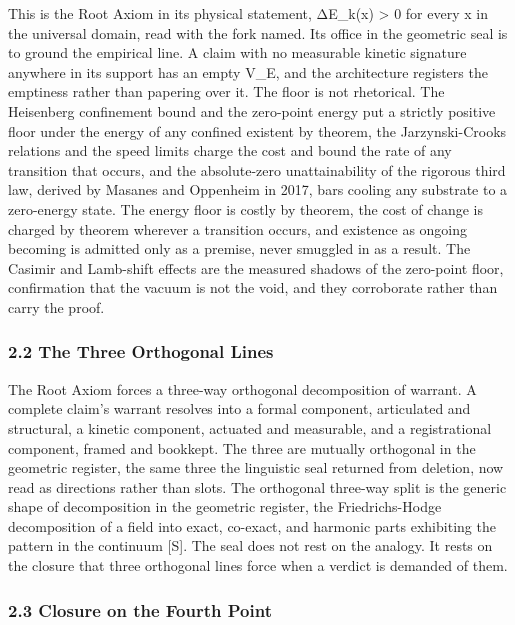 \documentclass[10pt,twocolumn]{article}
\begin{document}
This is the Root Axiom in its physical statement, ΔE\_k(x)
\textgreater{} 0 for every x in the universal domain, read with the fork
named. Its office in the geometric seal is to ground the empirical line.
A claim with no measurable kinetic signature anywhere in its support has
an empty V\_E, and the architecture registers the emptiness rather than
papering over it. The floor is not rhetorical. The Heisenberg
confinement bound and the zero-point energy put a strictly positive
floor under the energy of any confined existent by theorem, the
Jarzynski-Crooks relations and the speed limits charge the cost and
bound the rate of any transition that occurs, and the absolute-zero
unattainability of the rigorous third law, derived by Masanes and
Oppenheim in 2017, bars cooling any substrate to a zero-energy state.
The energy floor is costly by theorem, the cost of change is charged by
theorem wherever a transition occurs, and existence as ongoing becoming
is admitted only as a premise, never smuggled in as a result. The
Casimir and Lamb-shift effects are the measured shadows of the
zero-point floor, confirmation that the vacuum is not the void, and they
corroborate rather than carry the proof.

\hypertarget{the-three-orthogonal-lines}{%
\subsubsection{2.2 The Three Orthogonal
Lines}\label{the-three-orthogonal-lines}}

The Root Axiom forces a three-way orthogonal decomposition of warrant. A
complete claim's warrant resolves into a formal component, articulated
and structural, a kinetic component, actuated and measurable, and a
registrational component, framed and bookkept. The three are mutually
orthogonal in the geometric register, the same three the linguistic seal
returned from deletion, now read as directions rather than slots. The
orthogonal three-way split is the generic shape of decomposition in the
geometric register, the Friedrichs-Hodge decomposition of a field into
exact, co-exact, and harmonic parts exhibiting the pattern in the
continuum {[}S{]}. The seal does not rest on the analogy. It rests on
the closure that three orthogonal lines force when a verdict is demanded
of them.

\hypertarget{closure-on-the-fourth-point}{%
\subsubsection{2.3 Closure on the Fourth
Point}\label{closure-on-the-fourth-point}}
\end{document}
